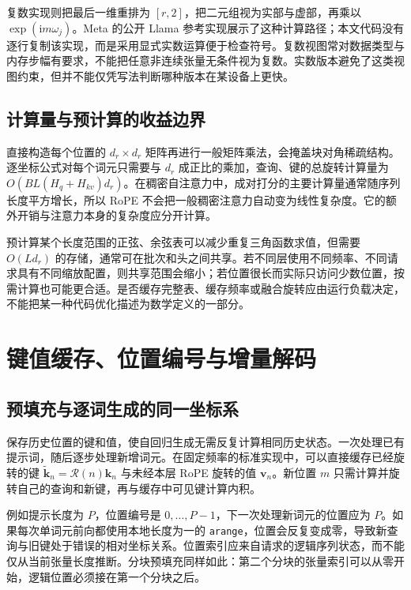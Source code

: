 \documentclass[UTF8,12pt,a4paper,fontset=fandol]{ctexart}
\begin{document}
复数实现则把最后一维重排为 $[r,2]$，把二元组视为实部与虚部，再乘以 $\exp(\mathrm i m\omega_j)$。Meta 的公开 Llama 参考实现展示了这种计算路径\cite{meta-llama}；本文代码没有逐行复制该实现，而是采用显式实数运算便于检查符号。复数视图常对数据类型与内存步幅有要求，不能把任意非连续张量无条件视为复数。实数版本避免了这类视图约束，但并不能仅凭写法判断哪种版本在某设备上更快。

\subsection{计算量与预计算的收益边界}
直接构造每个位置的 $d_r\times d_r$ 矩阵再进行一般矩阵乘法，会掩盖块对角稀疏结构。逐坐标公式对每个词元只需要与 $d_r$ 成正比的乘加，查询、键的总旋转计算量为 $O(BL(H_q+H_{kv})d_r)$。在稠密自注意力中，成对打分的主要计算量通常随序列长度平方增长，所以 RoPE 不会把一般稠密注意力自动变为线性复杂度。它的额外开销与注意力本身的复杂度应分开计算。

预计算某个长度范围的正弦、余弦表可以减少重复三角函数求值，但需要 $O(Ld_r)$ 的存储，通常可在批次和头之间共享。若不同层使用不同频率、不同请求具有不同缩放配置，则共享范围会缩小；若位置很长而实际只访问少数位置，按需计算也可能更合适。是否缓存完整表、缓存频率或融合旋转应由运行负载决定，不能把某一种代码优化描述为数学定义的一部分。

\section{键值缓存、位置编号与增量解码}
\label{sec:rope-cache}

\subsection{预填充与逐词生成的同一坐标系}
保存历史位置的键和值，使自回归生成无需反复计算相同历史状态。一次处理已有提示词，随后逐步处理新增词元。在固定频率的标准实现中，可以直接缓存已经旋转的键 $\widetilde{\mathbf k}_n=\mathcal R(n)\mathbf k_n$ 与未经本层 RoPE 旋转的值 $\mathbf v_n$。新位置 $m$ 只需计算并旋转自己的查询和新键，再与缓存中可见键计算内积。

例如提示长度为 $P$，位置编号是 $0,\ldots,P-1$，下一次处理新词元的位置应为 $P$。如果每次单词元前向都使用本地长度为一的 \texttt{arange}，位置会反复变成零，导致新查询与旧键处于错误的相对坐标关系。位置索引应来自请求的逻辑序列状态，而不能仅从当前张量长度推断。分块预填充同样如此：第二个分块的张量索引可以从零开始，逻辑位置必须接在第一个分块之后。
\end{document}
